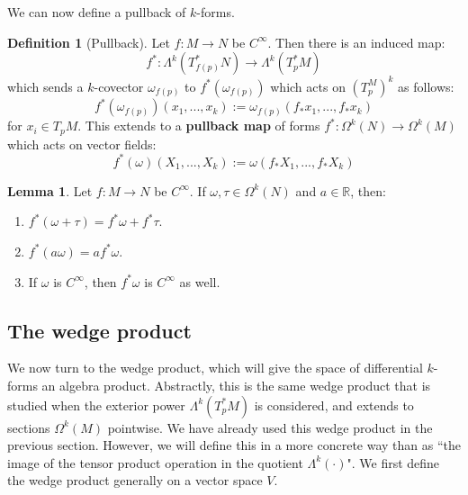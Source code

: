 \documentclass[11pt, oneside]{article}   	%
\theoremstyle{definition}
\newtheorem{definition}{Definition}[section]
\newtheorem{lemma}[theorem]{Lemma}
\begin{document}
We can now define a pullback of $k$-forms. 
\begin{definition}[Pullback]
	Let $f : M\rightarrow N$ be $C^\infty$. Then there is an induced map:
	\begin{equation}
		f^* : \Lambda^k\left(T_{f(p)}^* N\right)\rightarrow\Lambda^k\left(T_p^* M\right)
	\end{equation}
	which sends a $k$-covector $\omega_{f(p)}$ to $f^*(\omega_{f(p)})$ which acts on $\left(T_p^M\right)^k$ as follows:
	\begin{equation}
		f^*(\omega_{f(p)})(x_1, ..., x_k) := \omega_{f(p)}(f_* x_1, ..., f_* x_k)
	\end{equation}
	for $x_i\in T_p M$. This extends to a \textbf{pullback map} of forms $f^* : \Omega^k(N)\rightarrow\Omega^k(M)$ which 
	acts on vector fields:
	\begin{equation}
		f^*(\omega)(X_1, ..., X_k) := \omega(f_* X_1, ..., f_* X_k)
	\end{equation}
\end{definition}
\begin{lemma}
	Let $f : M\rightarrow N$ be $C^\infty$. If $\omega, \tau\in\Omega^k(N)$ and $a\in\mathbb R$, then:
	\begin{enumerate}
		\item $f^*(\omega + \tau) = f^*\omega + f^*\tau$. 
		\item $f^*(a\omega) = af^*\omega$. 
		\item If $\omega$ is $C^\infty$, then $f^*\omega$ is $C^\infty$ as well. 
	\end{enumerate}
\end{lemma}

\subsection{The wedge product}

We now turn to the wedge product, which will give the space of differential $k$-forms an algebra product. Abstractly, this 
is the same wedge product that is studied when the exterior power $\Lambda^k(T_p^* M)$ is considered, and extends 
to sections $\Omega^k(M)$ pointwise. We have already used this wedge product in the previous section. However, we will 
define this in a more concrete way than as ``the image of the tensor product operation in the quotient $\Lambda^k(\cdot)$". We 
first define the wedge product generally on a vector space $V$. 
\end{document}

